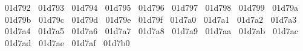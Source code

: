 {  ^^^^^^01d792%
  ^^^^^^01d793%
  ^^^^^^01d794%
  ^^^^^^01d795%
  ^^^^^^01d796%
  ^^^^^^01d797%
  ^^^^^^01d798%
  ^^^^^^01d799%
  ^^^^^^01d79a%
  ^^^^^^01d79b%
  ^^^^^^01d79c%
  ^^^^^^01d79d%
  ^^^^^^01d79e%
  ^^^^^^01d79f%
  ^^^^^^01d7a0%
  ^^^^^^01d7a1%
  ^^^^^^01d7a2%
  ^^^^^^01d7a3%
  ^^^^^^01d7a4%
  ^^^^^^01d7a5%
  ^^^^^^01d7a6%
  ^^^^^^01d7a7%
  ^^^^^^01d7a8%
  ^^^^^^01d7a9%
  ^^^^^^01d7aa%
  ^^^^^^01d7ab%
  ^^^^^^01d7ac%
  ^^^^^^01d7ad%
  ^^^^^^01d7ae%
  ^^^^^^01d7af%
  ^^^^^^01d7b0%
}
